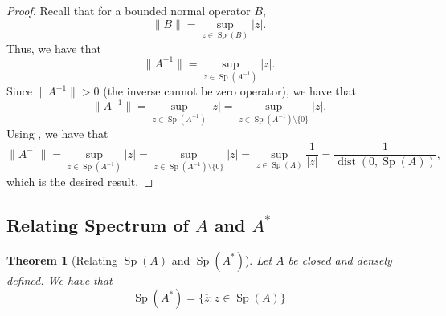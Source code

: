 \documentclass[12pt,a4paper]{article}
\newcommand{\Sp}[1]{\operatorname{Sp}\!\left(#1\right)}
\theoremstyle{boldthm}
\newtheorem{theorem}{Theorem}[section]
\theoremstyle{bolddefn}
\begin{document}
\begin{proof}
Recall that for a bounded normal operator $B$, 
\begin{equation}
    \| B \| = \sup_{z \in \Sp{B}} |z|.
\end{equation}
Thus, we have that 
\begin{equation}
    \|A^{-1} \| = \sup_{z \in \Sp{A^{-1}}} |z|.
\end{equation}
Since $\| A^{-1} \| > 0$ (the inverse cannot be zero operator), we have that
\begin{equation}
    \|A^{-1} \| = \sup_{z \in \Sp{A^{-1}}} |z| = \sup_{z \in \Sp{A^{-1}} \setminus \{0\}} |z|.
\end{equation}
Using , we have that
\begin{equation}
    \|A^{-1} \| = \sup_{z \in \Sp{A^{-1}}} |z| = \sup_{z \in \Sp{A^{-1}} \setminus \{0\}} |z| = \sup_{z \in \Sp{A}} \frac{1}{|z|} = \frac{1}{\operatorname{dist}(0, \Sp{A})},
\end{equation}
which is the desired result.

\end{proof}



\subsection{Relating Spectrum of $A$ and $A^*$}

\begin{theorem}[Relating $\Sp{A}$ and $\Sp{A^*}$]
    Let $A$ be closed and densely defined. We have that
    \begin{equation}
        \Sp{A^*} = \{ \overline z : z \in \Sp{A}\}
    \end{equation}
\end{theorem}
\end{document}
